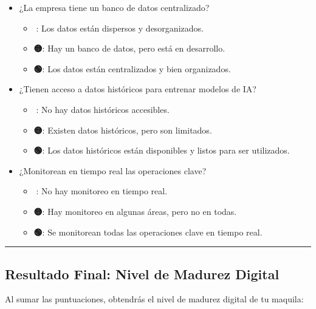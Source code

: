 \documentclass[
  10pt,
  letterpaper,
]{book}
\providecommand{\tightlist}{%
  \setlength{\itemsep}{0pt}\setlength{\parskip}{0pt}}\usepackage{longtable,booktabs,array}
\begin{document}
\begin{itemize}
\tightlist
\item
  ¿La empresa tiene un banco de datos centralizado?

  \begin{itemize}
  \tightlist
  \item
    \textbf{🔴}: Los datos están dispersos y desorganizados.
  \item
    \textbf{🟡}: Hay un banco de datos, pero está en desarrollo.
  \item
    \textbf{🟢}: Los datos están centralizados y bien organizados.
  \end{itemize}
\item
  ¿Tienen acceso a datos históricos para entrenar modelos de IA?

  \begin{itemize}
  \tightlist
  \item
    \textbf{🔴}: No hay datos históricos accesibles.
  \item
    \textbf{🟡}: Existen datos históricos, pero son limitados.
  \item
    \textbf{🟢}: Los datos históricos están disponibles y listos para
    ser utilizados.
  \end{itemize}
\item
  ¿Monitorean en tiempo real las operaciones clave?

  \begin{itemize}
  \tightlist
  \item
    \textbf{🔴}: No hay monitoreo en tiempo real.
  \item
    \textbf{🟡}: Hay monitoreo en algunas áreas, pero no en todas.
  \item
    \textbf{🟢}: Se monitorean todas las operaciones clave en tiempo
    real.
  \end{itemize}
\end{itemize}

\begin{center}\rule{0.5\linewidth}{0.5pt}\end{center}

\subsection{Resultado Final: Nivel de Madurez
Digital}\label{resultado-final-nivel-de-madurez-digital}

Al sumar las puntuaciones, obtendrás el nivel de madurez digital de tu
maquila:
\end{document}
